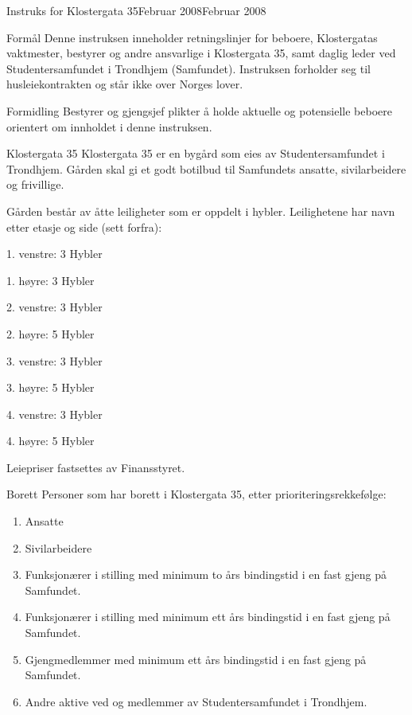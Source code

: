 \documentclass[fsbok.tex]{subfiles}
\begin{document}
\begin{instruks}{Instruks for Klostergata 35}{Februar 2008}{Februar 2008}

    \begin{instruksledd}{Formål}
        Denne instruksen inneholder retningslinjer for beboere, Klostergatas vaktmester,
        bestyrer og andre ansvarlige
        i Klostergata 35, samt daglig leder ved Studentersamfundet i Trondhjem
        (Samfundet). Instruksen forholder seg til
        husleiekontrakten og står ikke over Norges lover.
    \end{instruksledd}
    
    \begin{instruksledd}{Formidling}
        Bestyrer og gjengsjef plikter å holde aktuelle og potensielle beboere orientert om
        innholdet i denne
        instruksen.
    \end{instruksledd}

    \begin{instruksledd}{Klostergata 35}
        Klostergata 35 er en bygård som eies av Studentersamfundet i Trondhjem. Gården
        skal gi et godt botilbud til
        Samfundets ansatte, sivilarbeidere og frivillige.
        
        Gården består av åtte leiligheter som er oppdelt i hybler. Leilighetene har navn
        etter etasje og side (sett forfra):
        \begin{description}
            \item 1. venstre: 3 Hybler
            \item 1. høyre: 3 Hybler
            \item 2. venstre: 3 Hybler
            \item 2. høyre: 5 Hybler
            \item 3. venstre: 3 Hybler
            \item 3. høyre: 5 Hybler
            \item 4. venstre: 3 Hybler
            \item 4. høyre: 5 Hybler
        \end{description}
        Leiepriser fastsettes av Finansstyret.
    \end{instruksledd}

    \begin{instruksledd}{Borett}
        Personer som har borett i Klostergata 35, etter prioriteringsrekkefølge:
        \begin{enumerate}
            \item Ansatte
            \item Sivilarbeidere
            \item Funksjonærer i stilling med minimum to års bindingstid i en fast gjeng på Samfundet.
            \item Funksjonærer i stilling med minimum ett års bindingstid i en fast gjeng på Samfundet.
            \item Gjengmedlemmer med minimum ett års bindingstid i en fast gjeng på Samfundet.
            \item Andre aktive ved og medlemmer av Studentersamfundet i Trondhjem.
        \end{enumerate}
        

\end{instruksledd}
\end{instruks}
\end{document}
